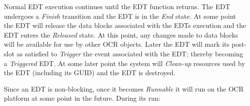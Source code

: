 Normal EDT execution continues until the EDT function returns. The EDT undergoes
a \emph{Finish} transition and the EDT is in
the \emph{End} state. At some point the EDT will
release the data blocks associated with the EDTs execution and the
EDT enters the \emph{Released} state.
At this point, any changes made to data blocks will
be available for use by other OCR objects. Later the EDT will
mark its post-slot as satisfied to \emph{Trigger} the event
associated with the EDT; thereby becoming a \emph{Triggered} EDT. At
some later point the
system will \emph{Clean-up} resources
used by the EDT (including its GUID) and the EDT is destroyed.

Since an EDT is non-blocking, once it
becomes \emph{Runnable} it will run on the OCR platform at some point in the
future. During its run:
